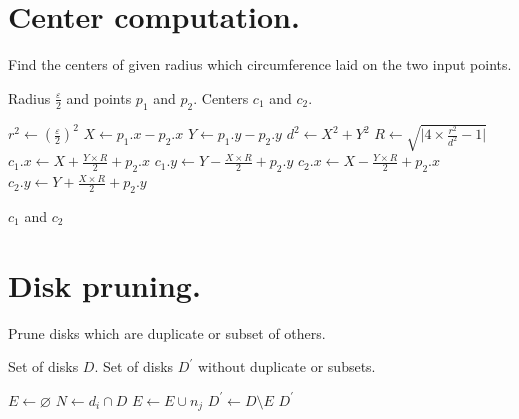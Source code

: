 \appendix

\section{Center computation.}
{\ssp
\begin{algorithm}
    \caption{Find the centers of given radius which circumference laid on the two input points.}
    \begin{algorithmic}[1]
        \Require Radius $\frac{\varepsilon}{2}$ and points $p_1$ and $p_2$.
        \Ensure Centers $c_1$ and $c_2$.
        
        \State $r^2 \gets (\frac{\varepsilon}{2})^2$
        \State $X \gets p_1.x - p_2.x$
        \State $Y \gets p_1.y - p_2.y$
        \State $d^2 \gets X^2 + Y^2$
        \State $R \gets \sqrt{\lvert 4 \times \frac{r^2}{d^2} - 1 \rvert}$
        \State $c_1.x \gets X + \frac{Y \times R}{2} + p_2.x$
        \State $c_1.y \gets Y - \frac{X \times R}{2} + p_2.y$
        \State $c_2.x \gets X - \frac{Y \times R}{2} + p_2.x$
        \State $c_2.y \gets Y + \frac{X \times R}{2} + p_2.y$
        
        \State \Return $c_1$ and $c_2$
        \EndFunction
    \end{algorithmic}
    \label{app:centers}
\end{algorithm}
}

\section{Disk pruning.}
{\ssp
\begin{algorithm}
    \caption{Prune disks which are duplicate or subset of others.}
     \begin{algorithmic}[1]
         \Require Set of disks $D$.
         \Ensure Set of disks $D^{\prime}$ without duplicate or subsets.
         
         \State $E \gets \varnothing$
             \State $N \gets d_i \cap D$
                         \State $E \gets E \cup {n_j}$
                 \EndIf
             \EndFor
         \EndFor        
         \State $D^{\prime} \gets D \setminus E$
         \State \Return $D^{\prime}$
         \EndFunction
     \end{algorithmic}
    \label{app:disks}
\end{algorithm}
}

